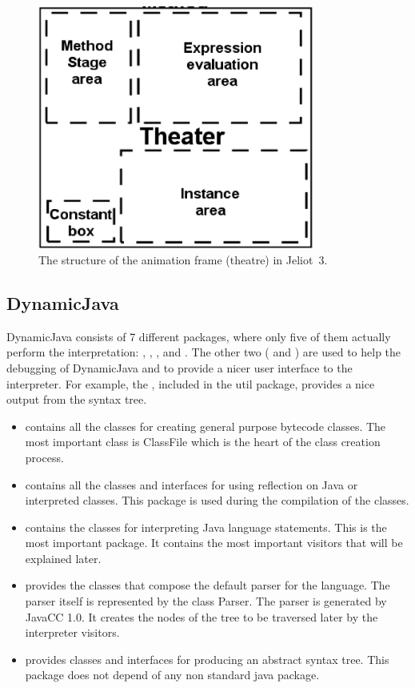 \begin{figure}[!htb]
\begin{center}
\includegraphics[height=8cm]{jeliot3_theatre_structure.eps}
\caption{The structure of the animation frame (theatre) in Jeliot~3.}
\label{fig:jeliot3_theatre_structure}
\end{center}
\end{figure}

\subsection{DynamicJava}
\label{sec:DynamicJava}

DynamicJava consists of 7 different packages, where only five
of them actually perform the interpretation: , ,
,  and . The other two ( and ) are
used to help the debugging of DynamicJava and to provide a nicer
user interface to the interpreter. For example, the ,
included in the util package, provides a nice output from the syntax tree.

\begin{itemize}
\item {} contains all the classes for creating general purpose bytecode
classes. The most important class is ClassFile which is the heart
of the class creation process.

\item {} contains all the classes and interfaces for using reflection
on Java or interpreted classes. This package is used during
the compilation of the classes.

\item {} contains the classes for interpreting Java language statements.
This is the most important package. It contains the most important
visitors that will be explained later.

\item {} provides the classes that compose the default parser for the
language. The parser itself is represented by the class Parser.
The parser is generated by JavaCC 1.0. It creates the nodes of the
tree to be traversed later by the interpreter visitors.

\item {} provides classes and interfaces for producing an abstract syntax
tree. This package does not depend of any non standard java package.
\end{itemize}

